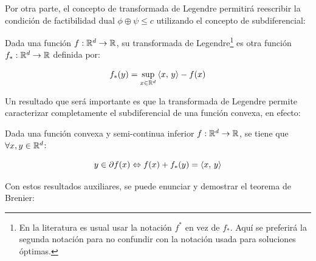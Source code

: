 
Por otra parte, el concepto de transformada de Legendre permitirá reescribir la condición de factibilidad dual $\phi\oplus\psi\leq c$ utilizando el concepto de subdiferencial:

\begin{defn}
	\label{defn:legendre}
	Dada una función $f:\mathbb{R}^d\to\mathbb{R}$, su transformada de Legendre\footnote{En la literatura es usual usar la notación $f^*$ en vez de $f_*$. Aquí se preferirá la segunda notación para no confundir con la notación usada para soluciones óptimas.} es otra función $f_*:\mathbb{R}^d\to\mathbb{R}$ definida por:

	\begin{equation}
		f_*(y) = \sup_{x\in\mathbb{R}^d} \left\langle x,\,y\right\rangle - f(x)
	\end{equation}
\end{defn}

Un resultado que será importante es que la transformada de Legendre permite caracterizar completamente el subdiferencial de una función convexa, en efecto:

\begin{prop}
	\label{prop:subdiff_legendre}
	Dada una función convexa y semi-continua inferior $f:\mathbb{R}^d\to\mathbb{R}$, se tiene que $\forall x,y\in\mathbb{R}^d$:

	\begin{equation}
		y\in\partial f(x) \Leftrightarrow f(x) + f_*(y) = \left\langle x,\,y\right\rangle
	\end{equation}
\end{prop}

Con estos resultados auxiliares, se puede enunciar y demostrar el teorema de Brenier:

